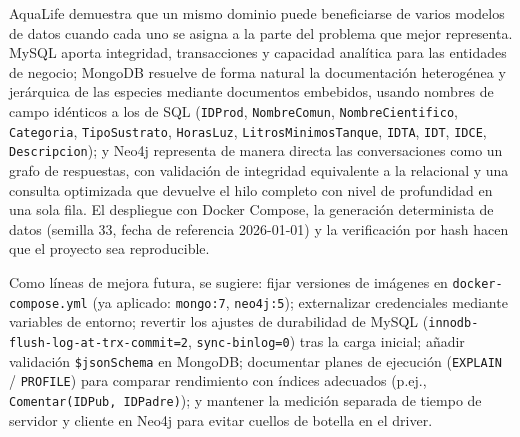 \documentclass[11pt, a4paper]{article}
\begin{document}
AquaLife demuestra que un mismo dominio puede beneficiarse de varios modelos de datos cuando cada uno se asigna a la parte del problema que mejor representa. MySQL aporta integridad, transacciones y capacidad analítica para las entidades de negocio; MongoDB resuelve de forma natural la documentación heterogénea y jerárquica de las especies mediante documentos embebidos, usando nombres de campo idénticos a los de SQL (\texttt{IDProd}, \texttt{NombreComun}, \texttt{NombreCientifico}, \texttt{Categoria}, \texttt{TipoSustrato}, \texttt{HorasLuz}, \texttt{LitrosMinimosTanque}, \texttt{IDTA}, \texttt{IDT}, \texttt{IDCE}, \texttt{Descripcion}); y Neo4j representa de manera directa las conversaciones como un grafo de respuestas, con validación de integridad equivalente a la relacional y una consulta optimizada que devuelve el hilo completo con nivel de profundidad en una sola fila. El despliegue con Docker Compose, la generación determinista de datos (semilla 33, fecha de referencia 2026-01-01) y la verificación por hash hacen que el proyecto sea reproducible.

Como líneas de mejora futura, se sugiere: fijar versiones de imágenes en \texttt{docker-compose.yml} (ya aplicado: \texttt{mongo:7}, \texttt{neo4j:5}); externalizar credenciales mediante variables de entorno; revertir los ajustes de durabilidad de MySQL (\texttt{innodb-flush-log-at-trx-commit=2}, \texttt{sync-binlog=0}) tras la carga inicial; añadir validación \texttt{\$jsonSchema} en MongoDB; documentar planes de ejecución (\texttt{EXPLAIN} / \texttt{PROFILE}) para comparar rendimiento con índices adecuados (p.ej., \texttt{Comentar(IDPub, IDPadre)}); y mantener la medición separada de tiempo de servidor y cliente en Neo4j para evitar cuellos de botella en el driver.
\end{document}
